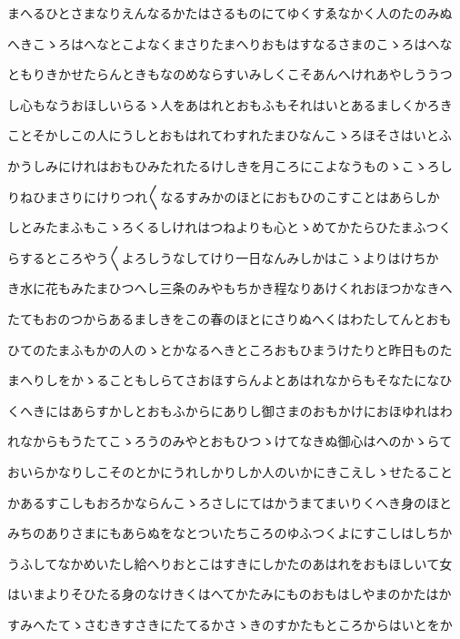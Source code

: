 \documentclass[a4paper,11pt,landscape]{ltjtarticle}
\begin{document}
まへるひとさまなりえんなるかたはさるものにてゆくすゑなかく人のたのみぬ
\par\medskip
へきこゝろはへなとこよなくまさりたまへりおもはすなるさまのこゝろはへな
\par\medskip
ともりきかせたらんときもなのめならすいみしくこそあんへけれあやしううつ
\par\medskip
し心もなうおほしいらるゝ人をあはれとおもふもそれはいとあるましくかろき
\par\medskip
ことそかしこの人にうしとおもはれてわすれたまひなんこゝろほそさはいとふ
\par\medskip
かうしみにけれはおもひみたれたるけしきを月ころにこよなうものゝこゝろし
\par\medskip
りねひまさりにけりつれ〱なるすみかのほとにおもひのこすことはあらしか
\par\medskip
しとみたまふもこゝろくるしけれはつねよりも心とゝめてかたらひたまふつく
\par\medskip
らするところやう〱よろしうなしてけり一日なんみしかはこゝよりはけちか
\par\medskip
き水に花もみたまひつへし三条のみやもちかき程なりあけくれおほつかなきへ
\par\medskip
たてもおのつからあるましきをこの春のほとにさりぬへくはわたしてんとおも
\par\medskip
ひてのたまふもかの人のゝとかなるへきところおもひまうけたりと昨日ものた
\par\medskip
まへりしをかゝることもしらてさおほすらんよとあはれなからもそなたになひ
\par\medskip
くへきにはあらすかしとおもふからにありし御さまのおもかけにおほゆれはわ
\par\medskip
れなからもうたてこゝろうのみやとおもひつゝけてなきぬ御心はへのかゝらて
\par\medskip
おいらかなりしこそのとかにうれしかりしか人のいかにきこえしゝせたること
\par\medskip
かあるすこしもおろかならんこゝろさしにてはかうまてまいりくへき身のほと
\par\medskip
みちのありさまにもあらぬをなとついたちころのゆふつくよにすこしはしちか
\par\medskip
うふしてなかめいたし給へりおとこはすきにしかたのあはれをおもほしいて女
\par\medskip
はいまよりそひたる身のなけきくはへてかたみにものおもはしやまのかたはか
\par\medskip
すみへたてゝさむきすさきにたてるかさゝきのすかたもところからはいとをか
\par\medskip
\end{document}
